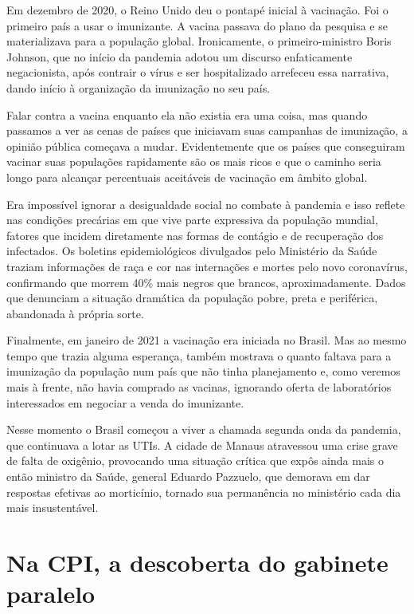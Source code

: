 Em dezembro de 2020, o Reino Unido deu o pontapé inicial à vacinação.
Foi o primeiro país a usar o imunizante. A vacina passava do plano da
pesquisa e se materializava para a população global. Ironicamente, o
primeiro-ministro Boris Johnson, que no início da pandemia adotou um
discurso enfaticamente negacionista, após contrair o vírus e ser
hospitalizado arrefeceu essa narrativa, dando início à organização da
imunização no seu país.

Falar contra a vacina enquanto ela não existia era uma coisa, mas quando
passamos a ver as cenas de países que iniciavam suas campanhas de
imunização, a opinião pública começava a mudar. Evidentemente que os
países que conseguiram vacinar suas populações rapidamente são os mais
ricos e que o caminho seria longo para alcançar percentuais aceitáveis
de vacinação em âmbito global.

Era impossível ignorar a desigualdade social no combate à pandemia e
isso reflete nas condições precárias em que vive parte expressiva da
população mundial, fatores que incidem diretamente nas formas de
contágio e de recuperação dos infectados. Os boletins epidemiológicos
divulgados pelo Ministério da Saúde traziam informações de raça e cor
nas internações e mortes pelo novo coronavírus, confirmando que morrem
40\% mais negros que brancos, aproximadamente. Dados que denunciam a
situação dramática da população pobre, preta e periférica, abandonada à
própria sorte.

Finalmente, em janeiro de 2021 a vacinação era iniciada no Brasil. Mas
ao mesmo tempo que trazia alguma esperança, também mostrava o quanto
faltava para a imunização da população num país que não tinha
planejamento e, como veremos mais à frente, não havia comprado as
vacinas, ignorando oferta de laboratórios interessados em negociar a
venda do imunizante.

Nesse momento o Brasil começou a viver a chamada segunda onda da
pandemia, que continuava a lotar as UTIs. A cidade de Manaus atravessou
uma crise grave de falta de oxigênio, provocando uma situação crítica
que expôs ainda mais o então ministro da Saúde, general Eduardo
Pazzuelo, que demorava em dar respostas efetivas ao morticínio, tornado
sua permanência no ministério cada dia mais insustentável.

\section{Na CPI, a descoberta do gabinete paralelo}

